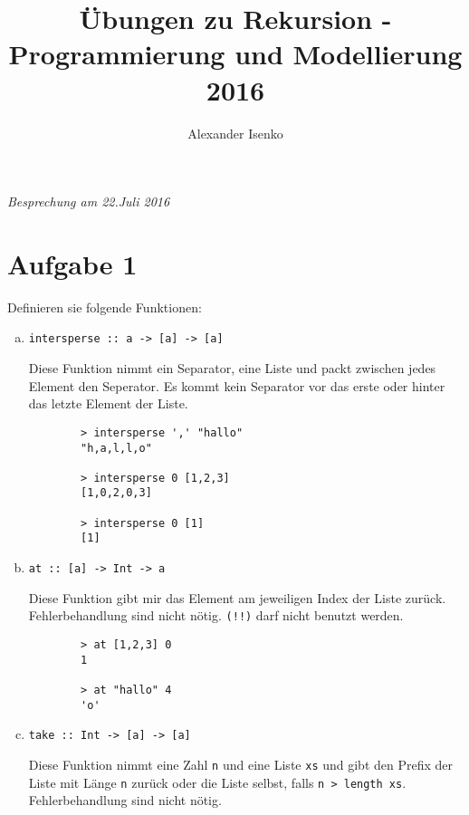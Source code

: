 \documentclass{article}
\title{Übungen zu Rekursion - Programmierung und Modellierung 2016}
\author{Alexander Isenko}
\begin{document}
\maketitle

\begin{center}
\textit{Besprechung am 22.Juli 2016}
\end{center}

\section*{Aufgabe 1}
Definieren sie folgende Funktionen:
\begin{enumerate} [a)]
    \item \begin{verbatim}
intersperse :: a -> [a] -> [a]
          \end{verbatim}
    Diese Funktion nimmt ein Separator, eine Liste und packt zwischen jedes Element den Seperator. Es kommt kein Separator vor das erste oder hinter das letzte Element der Liste.
    
    \begin{verbatim}
        > intersperse ',' "hallo"
        "h,a,l,l,o"
        
        > intersperse 0 [1,2,3]
        [1,0,2,0,3]
        
        > intersperse 0 [1]
        [1]
    \end{verbatim}

    \item \begin{verbatim}
at :: [a] -> Int -> a
          \end{verbatim}
    Diese Funktion gibt mir das Element am jeweiligen Index der Liste zurück. \\
    Fehlerbehandlung sind nicht nötig. \texttt{(!!)} darf nicht benutzt werden. \\

    \begin{verbatim}
        > at [1,2,3] 0
        1

        > at "hallo" 4
        'o'
    \end{verbatim}

\newpage
    \item \begin{verbatim}
take :: Int -> [a] -> [a]
          \end{verbatim}
    Diese Funktion nimmt eine Zahl \texttt{n} und eine Liste \texttt{xs} und gibt den Prefix der Liste mit Länge \texttt{n} zurück
    oder die Liste selbst, falls \texttt{n > length xs}. Fehlerbehandlung sind nicht nötig. \\


\end{enumerate}
\end{document}
